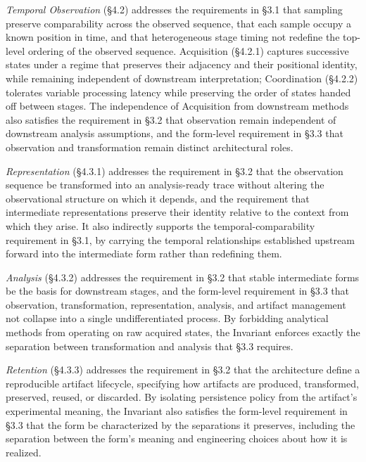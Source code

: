 \emph{Temporal Observation} (\S4.2) addresses the requirements in \S3.1 that sampling preserve comparability across the observed sequence, that each sample occupy a known position in time, and that heterogeneous stage timing not redefine the top-level ordering of the observed sequence. Acquisition (\S4.2.1) captures successive states under a regime that preserves their adjacency and their positional identity, while remaining independent of downstream interpretation; Coordination (\S4.2.2) tolerates variable processing latency while preserving the order of states handed off between stages. The independence of Acquisition from downstream methods also satisfies the requirement in \S3.2 that observation remain independent of downstream analysis assumptions, and the form-level requirement in \S3.3 that observation and transformation remain distinct architectural roles.


\emph{Representation} (\S4.3.1) addresses the requirement in \S3.2 that the observation sequence be transformed into an analysis-ready trace without altering the observational structure on which it depends, and the requirement that intermediate representations preserve their identity relative to the context from which they arise. It also indirectly supports the temporal-comparability requirement in \S3.1, by carrying the temporal relationships established upstream forward into the intermediate form rather than redefining them.

\emph{Analysis} (\S4.3.2) addresses the requirement in \S3.2 that stable intermediate forms be the basis for downstream stages, and the form-level requirement in \S3.3 that observation, transformation, representation, analysis, and artifact management not collapse into a single undifferentiated process. By forbidding analytical methods from operating on raw acquired states, the Invariant enforces exactly the separation between transformation and analysis that \S3.3 requires.

\emph{Retention} (\S4.3.3) addresses the requirement in \S3.2 that the architecture define a reproducible artifact lifecycle, specifying how artifacts are produced, transformed, preserved, reused, or discarded. By isolating persistence policy from the artifact's experimental meaning, the Invariant also satisfies the form-level requirement in \S3.3 that the form be characterized by the separations it preserves, including the separation between the form's meaning and engineering choices about how it is realized.

